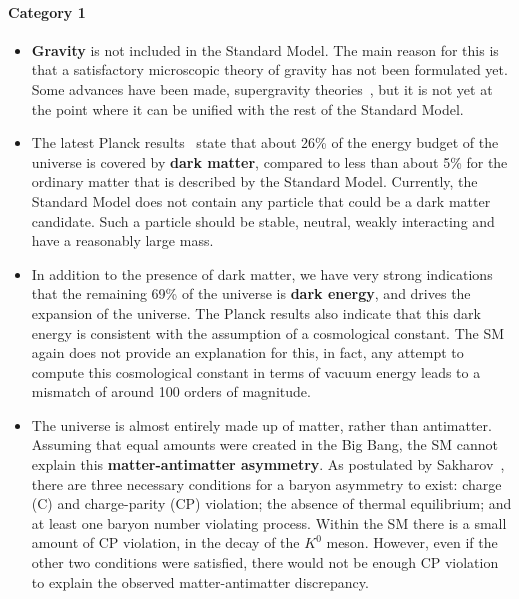 \paragraph{Category 1}
\begin{itemize}
  \item \textbf{Gravity} is not included in the Standard Model. The main reason for this is that
a satisfactory microscopic theory of gravity has not been formulated yet. Some advances have been
made, \eg supergravity
theories~\cite{VanNieuwenhuizen:1981ae,freedman2012supergravity,Nastase:2011aa}, but it is not yet
at the point where it can be unified with the rest of the Standard Model. 

  \item The latest Planck results~\cite{Planck:2015xua} state that about 26\% of the energy budget
of the universe is covered by \textbf{dark matter}, compared to less than about 5\% for the ordinary
matter that is described by the Standard Model. Currently, the Standard Model does not contain any
particle that could be a dark matter candidate. Such a particle should be stable, neutral, weakly
interacting and have a reasonably large mass. 

  \item In addition to the presence of dark matter, we have very strong indications that
the remaining 69\% of the universe is \textbf{dark energy}, and drives the expansion of the
universe. The Planck results also indicate that this dark energy is consistent with the assumption
of a cosmological constant. The SM again does not provide an explanation for this, in fact, any
attempt to compute this cosmological constant in terms of vacuum energy leads to a mismatch of
around 100 orders of magnitude. 

  \item The universe is almost entirely made up of matter, rather than antimatter. Assuming that
equal amounts were created in the Big Bang, the SM cannot explain this \textbf{matter-antimatter
asymmetry}. As postulated by Sakharov~\cite{Sakharov}, there are three necessary conditions for a
baryon asymmetry to exist: charge (C) and charge-parity (CP) violation; the absence of thermal
equilibrium; and at least one baryon number violating process. Within the SM there is a small amount
of CP violation, \eg in the decay of the $K^0$ meson. However, even if the other two conditions were
satisfied, there would not be enough CP violation to explain the observed matter-antimatter
discrepancy. 
  

\end{itemize}
